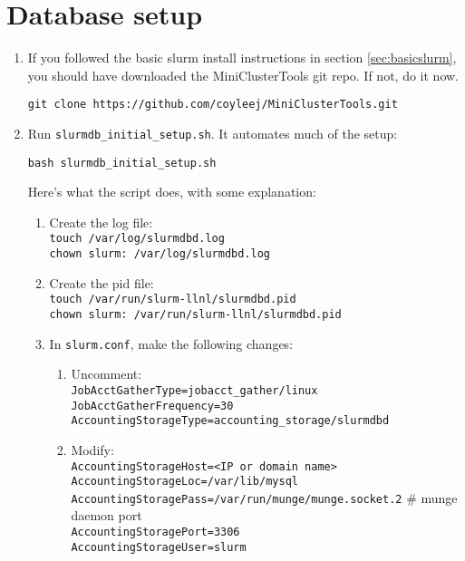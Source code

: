 
\section{Database setup} \label{sec:slurmDB}

\begin{enumerate}

\item If you followed the basic slurm install instructions in section \ref{sec:basicslurm}, you should have downloaded the MiniClusterTools git repo. If not, do it now.

\texttt{git clone https://github.com/coyleej/MiniClusterTools.git}

\item Run \texttt{slurmdb\_initial\_setup.sh}. It automates much of the setup:

	\texttt{bash slurmdb\_initial\_setup.sh}

	Here's what the script does, with some explanation:

	\begin{enumerate}
	\item Create the log file: \\
	\texttt{touch /var/log/slurmdbd.log} \\
	\texttt{chown slurm: /var/log/slurmdbd.log}

	\item Create the pid file: \\
	\texttt{touch /var/run/slurm-llnl/slurmdbd.pid} \\
	\texttt{chown slurm: /var/run/slurm-llnl/slurmdbd.pid}

	\item In \texttt{slurm.conf}, make the following changes:

		\begin{enumerate}
		\item Uncomment: \\
		\texttt{JobAcctGatherType=jobacct\_gather/linux} \\
		\texttt{JobAcctGatherFrequency=30} \\
		\texttt{AccountingStorageType=accounting\_storage/slurmdbd}

		\item Modify: \\
		\texttt{AccountingStorageHost=<IP or domain name>} \\
		\texttt{AccountingStorageLoc=/var/lib/mysql} \\
		\texttt{AccountingStoragePass=/var/run/munge/munge.socket.2}   \quad \# munge daemon port \\
		\texttt{AccountingStoragePort=3306} \\
		\texttt{AccountingStorageUser=slurm}


\end{enumerate}
\end{enumerate}
\end{enumerate}
